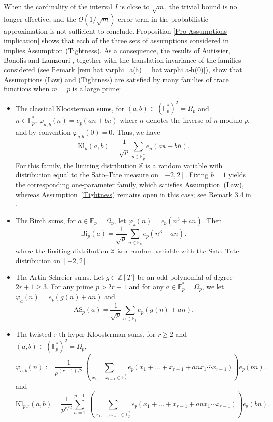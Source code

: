 \documentclass[12pt]{amsart}
\theoremstyle{definition}
\numberwithin{equation}{section}
\numberwithin{equation}{section}
\def\F{\mathbb{F}}
\def\Z{\mathbb{Z}}
\def\Bi{\mathrm{Bi}}
\def\AS{\mathrm{AS}}
\def\Kl{\mathrm{Kl}}
\def\X{\mathbb{X}}
\begin{document}
When the cardinality of the interval $I$ is close to $\sqrt{m}$, the trivial bound is no longer effective, and the $O(1/\sqrt{m})$ error term in the probabilistic approximation is not sufficient to conclude. 
Proposition \ref{Pro Assumptions implication} shows that each of the three sets of assumptions considered in \cite{ABL21} implies Assumption (\hyperlink{Ass Tightness}{Tightness}).
As a consequence, the results of Autissier, Bonolis and Lamzouri \cite{ABL21}, together
with the translation-invariance of the families considered (see Remark \ref{rem hat varphi_a(h) = hat varphi a-h(0)}), show
that Assumptions (\hyperlink{Ass Law}{Law}) and (\hyperlink{Ass Tightness}{Tightness}) are satisfied by many families of trace
functions when $m = p$ is a large prime:
\begin{itemize}
    \item The classical Kloosterman sums, for $(a,b)\in (\F_p^*)^2 = \Omega_p $ and $n\in \F_p^*,\, \varphi_{a,b}(n) = e_p(an+b\overline{n})$ where $\overline{n}$ denotes the inverse of $n $ modulo $p$, and by convention $\varphi_{a,b}(0)=0$. Thus, we have
    \[
    \Kl_{p}(a,b) = \frac{1}{\sqrt{p}}\sum_{n\in \F_p^*}
    e_p(an+b\overline{n}).
    \] For this family, the limiting distribution
    $\X$ is a random variable with distribution equal to the Sato--Tate measure on $[-2,2]$.
Fixing \(b=1\) yields the corresponding one-parameter family, which satisfies Assumption~(\hyperlink{Ass Law}{Law}), whereas Assumption~(\hyperlink{Ass Tightness}{Tightness}) remains open in this case; see Remark 3.4 in \cite{KS16}.
    
    \item The Birch sums, for \(a\in\F_p=\Omega_p\), let
\(\varphi_a(n)=e_p(n^3+an)\). Then
    \[
    \Bi_p(a) = \frac{1}{\sqrt{p}}\sum_{n\in \F_p}  e_p(n^3 + an).
    \]
    where the limiting distribution $\X$ is a random variable with the Sato--Tate distribution on $[-2,2]$.

    \item The Artin-Schreier sums. Let $g\in\Z[T]$ be an odd polynomial of degree $2r+1\geq 3$. For any prime $p> 2r+1$ and for any $a\in  \F_p^*  = \Omega_p$, we let $\varphi_a(n) = e_p(g(n) + an)$ and
    \[
    \AS_p(a) = \frac{1}{\sqrt{p}}
    \sum_{n\in \F_p}  e_p(g(n) + an).
    \]

    
    \item The twisted $r$-th hyper-Kloosterman sums, for $r\geq 2$ and $(a,b) \in (\F_p^*)^2 = \Omega_p,$ 
    \[
    \varphi_{a,b}(n) := \frac{1}{p^{(r-1)/2}}
    \;\left(
    \sum_{x_1,...,x_{r-1}\in\F_p^*}
    e_p(x_1+...+x_{r-1}+ 
    \overline{an x_1\cdots x_{r-1}})\right)e_p(bn).
    \]
    and
    \[
    \Kl_{p,r}(a,b) = \frac{1}{p^{r/2}}\sum_{n = 1}^{p-1}
    \;\left(
    \sum_{x_1,...,x_{r-1}\in\F_p^*}
    e_p(x_1+...+x_{r-1}+ 
    \overline{an x_1\cdots x_{r-1}})\right)e_p(bn).
    \]


\end{itemize}
\end{document}
